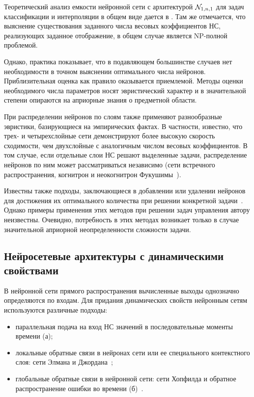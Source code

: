 Теоретический анализ емкости нейронной сети с архитектурой
$\mathcal{N}_{1,n,1}$ для задач классификации и интерполяции в общем виде
дается в \cite{sontag93}.  Там же отмечается, что выяснение
существования заданного числа весовых коэффициентов НС, реализующих
заданное отображение, в общем случае является NP-полной проблемой.

Однако, практика показывает, что в подавляющем большинстве случаев нет
необходимости в точном выяснении оптимального числа нейронов.
Приблизительная оценка как правило оказывается приемлемой.  Методы
оценки необходимого числа параметров носят эвристический характер и в
значительной степени опираются на априорные знания о предметной
области.

При распределении нейронов по слоям также применяют разнообразные
эвристики, базирующиеся на эмпирических фактах.  В частности,
известно, что трех- и четырехслойные сети демонстрируют более высокую
скорость сходимости, чем двухслойные с аналогичным числом весовых
коэффициентов.  В том случае, если отдельные слои НС решают выделенные
задачи, распределение нейронов по ним может рассматриваться независимо
(сети встречного распространения, когнитрон и неокогнитрон
Фукушимы~\cite{wasser92}).

Известны также подходы, заключающиеся в добавлении или удалении
нейронов для достижения их оптимального количества при решении
конкретной задачи~\cite{gibb96}.  Однако примеры применения этих
методов при решении задач управления автору неизвестны.  Очевидно,
потребность в этих методах возникает только в случае значительной
априорной неопределенности сложности задачи.

\subsection{Нейросетевые архитектуры с динамическими свойствами}

В нейронной сети прямого распространения вычисленные выходы однозначно
определяются по входам.  Для придания динамических свойств нейронным
сетям используются различные подходы:

\begin{itemize}

\item
параллельная подача на вход НС значений в последовательные моменты
времени (а);

\item
локальные обратные связи в нейронах сети или ее специального
контекстного слоя: сети Элмана и Джордана~\cite{gibb96,golovko01};

\item
глобальные обратные связи в нейронной сети: сети Хопфилда и обратное
распространение ошибки во времени
(б)~\cite{wasser92,golovko01}.

\end{itemize}

